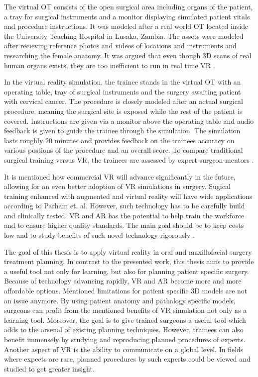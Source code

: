 The virtual OT consists of the open surgical area including organs of the patient, a tray for surgical instruments and a monitor displaying simulated patient vitals and procedure instructions.
It was modeled after a real world OT located inside the University Teaching Hospital in Lusaka, Zambia.
The assets were modeled after recieving reference photos and videos of locations and instruments and researching the female anatomy.
It was argued that even though 3D scans of real human organs exists, they are too inefficient to run in real time VR \cite{RN52}.

In the virtual reality simulation, the trainee stands in the virtual OT with an operating table, tray of surgical instruments and the surgery awaiting patient with cervical cancer.
The procedure is closely modeled after an actual surgical procedure, meaning the surgical site is exposed while the rest of the patient is covered.
Instructions are given via a monitor above the operating table and audio feedback is given to guide the trainee through the simulation.
The simulation lasts roughly 20 minutes and provides feedback on the trainees accuracy on various postions of the procedure and an overall score.
To compare traditional surgical training versus VR, the trainees are assessed by expert surgeon-mentors \cite{RN52}.

It is mentioned how commercial VR will advance significantly in the future, allowing for an even better adoption of VR simulations in surgery.
Sugical training enhanced with augmented and virtual reality will have wide applications according to Parham et. al.
However, such technology has to be carefully build and clinically tested.
VR and AR has the potential to help train the workforce and to ensure higher quality standards.
The main goal should be to keep costs low and to study benefits of such novel technology rigorously \cite{RN52}.

The goal of this thesis is to apply virtual reality in oral and maxillofacial surgery treatment planning.
In contrast to the presented work, this thesis aims to provide a useful tool not only for learning, but also for planning patient specific surgery.
Because of technology advancing rapidly, VR and AR become more and more affordable options.
Mentioned limitations for patient specific 3D models are not an issue anymore.
By using patient anatomy and pathalogy specific models, surgeons can profit from the mentioned benefits of VR simulation not only as a learning tool.
Moreover, the goal is to give trained surgeons a useful tool which adds to the arsenal of existing planning techniques.
However, trainees can also benefit immensely by studying and reproducing planned procedures of experts.
Another aspect of VR is the ability to communicate on a global level. 
In fields where expects are rare, planned procedures by such experts could be viewed and studied to get greater insight.

